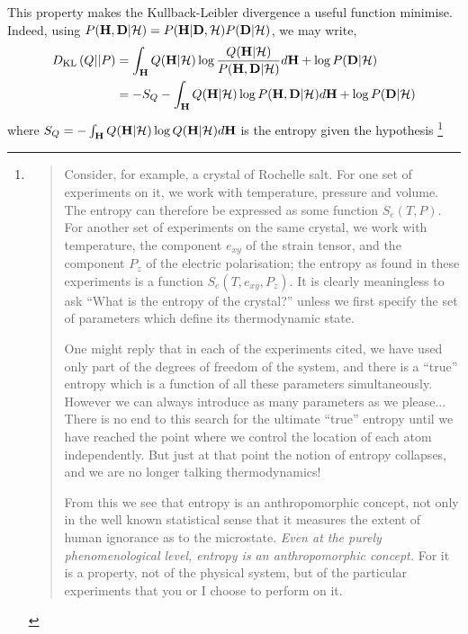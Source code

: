 {This property makes the Kullback-Leibler divergence a useful function minimise.
Indeed, using $P(\mathbf{H},\mathbf{D}|{\cal H}) = P(\mathbf{H}|\mathbf{D},{\cal H}) P(\mathbf{D}|{\cal H})$, 
we may write,
\begin{align}
  \KLD{Q}{P}  %
  &= \int_\vH Q(\vH|\H) \log\frac{Q(\vH|\H)}{P(\vH,\vD|\H)} d\vH  +  \log P(\vD|\H) \\
  &= -S_Q - \int_\vH Q(\vH|\H) \log P(\vH,\vD|\H)  d\vH + \log P(\vD|\H)
\end{align}
where $S_Q = - \int_{\mathbf{H}} Q(\mathbf{H}|{\cal H}) \log Q(\mathbf{H}|{\cal H}) d\mathbf{H}$ is the entropy given the hypothesis%
\footnote{
\begin{quote}
Consider, for example, a crystal of Rochelle salt.
For one set of experiments on it, we work with temperature, pressure and volume.
The entropy can therefore be expressed as some function $S_e(T,P)$.
For another set of experiments on the same crystal,
we work with temperature, the component $e_{xy}$ of the strain tensor,
and the component $P_z$ of the electric polarisation;
the entropy as found in these experiments is a function $S_e(T, e_{xy}, P_z)$.
It is clearly meaningless to ask ``What is the entropy of the crystal?''
unless we first specify the set of parameters which define its thermodynamic state.%

One might reply that in each of the experiments cited, 
we have used only part of the degrees of freedom of the system,
and there is a ``true'' entropy which is a function of all these parameters simultaneously.
However we can always introduce as many parameters as we please...
There is no end to this search for the ultimate ``true'' entropy until we have reached the point where we control
the location of each atom independently.
But just at that point the notion of entropy collapses, and we are no longer talking thermodynamics!

From this we see that entropy is an anthropomorphic concept,
not only in the well known statistical sense that it measures the extent of human ignorance as to the microstate.
{\em Even at the purely phenomenological level, entropy is an anthropomorphic concept.}
For it is a property, not of the physical system,
but of the particular experiments that you or I choose to perform on it.


\end{quote}}}
